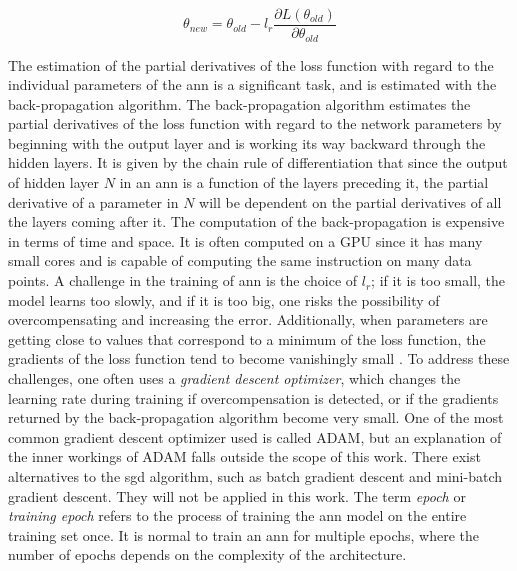 \begin{equation}
    \theta_{new} = \theta_{old} - l_r \frac{\partial L(\theta_{old})}{\partial \theta_{old}}
    \label{eq:sgd}
\end{equation}

The estimation of the partial derivatives of the loss function with regard to the individual parameters of the \acrshort{ann} is a significant task, and is estimated with the back-propagation algorithm. The back-propagation algorithm estimates the partial derivatives of the loss function with regard to the network parameters by beginning with the output layer and is working its way backward through the hidden layers. It is given by the chain rule of differentiation that since the output of hidden layer $N$ in an \acrshort{ann} is a function of the layers preceding it, the partial derivative of a parameter in $N$ will be dependent on the partial derivatives of all the layers coming after it. The computation of the back-propagation is expensive in terms of time and space. It is often computed on a GPU since it has many small cores and is capable of computing the same instruction on many data points. A challenge in the training of \acrshort{ann} is the choice of $l_r$; if it is too small, the model learns too slowly, and if it is too big, one risks the possibility of overcompensating and increasing the error. Additionally, when parameters are getting close to values that correspond to a minimum of the loss function, the gradients of the loss function tend to become vanishingly small \cite{dl_book}. To address these challenges, one often uses a \textit{gradient descent optimizer}, which changes the learning rate during training if overcompensation is detected, or if the gradients returned by the back-propagation algorithm become very small. One of the most common gradient descent optimizer used is called ADAM, but an explanation of the inner workings of ADAM falls outside the scope of this work. There exist alternatives to the \acrshort{sgd} algorithm, such as batch gradient descent and mini-batch gradient descent. They will not be applied in this work. The term \textit{epoch} or \textit{training epoch} refers to the process of training the \acrshort{ann} model on the entire training set once. It is normal to train an \acrshort{ann} for multiple epochs, where the number of epochs depends on the complexity of the architecture.  

